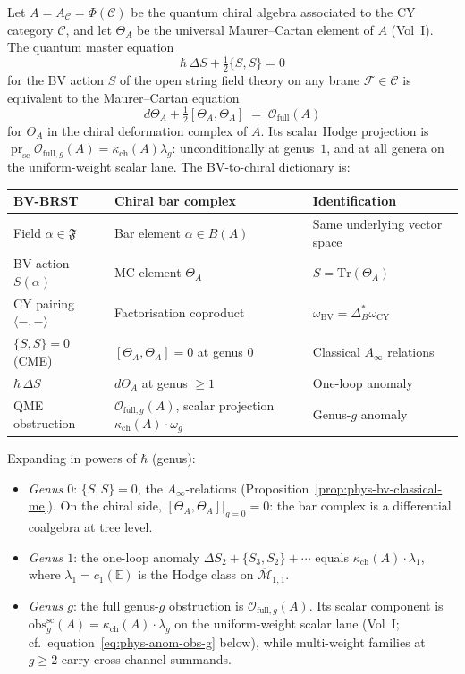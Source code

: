\begin{theorem}[Quantum master equation = Maurer--Cartan equation for \texorpdfstring{$\Theta_A$}{Theta-A}]
\label{thm:phys-bv-qme-mc}
Let $A = A_\mathcal{C} = \Phi(\mathcal{C})$ be the quantum chiral algebra associated to the CY category $\mathcal{C}$, and let $\Theta_A$ be the universal Maurer--Cartan element of $A$ (Vol~I). The quantum master equation
\[
 \hbar\,\Delta S + \tfrac{1}{2}\{S, S\} = 0
\]
for the BV action $S$ of the open string field theory on any brane $\mathcal{F} \in \mathcal{C}$ is equivalent to the Maurer--Cartan equation
\[
 d\Theta_A + \tfrac{1}{2}[\Theta_A, \Theta_A] \;=\; \mathcal{O}_{\mathrm{full}}(A)
\]
for $\Theta_A$ in the chiral deformation complex of $A$. Its scalar
Hodge projection is $\operatorname{pr}_{\mathrm{sc}}\mathcal{O}_{\mathrm{full},g}(A)
= \kappa_{\mathrm{ch}}(A)\lambda_g$: unconditionally at genus~$1$, and at
all genera on the uniform-weight scalar lane. The BV-to-chiral dictionary is:
\begin{center}
\renewcommand{\arraystretch}{1.3}
\begin{tabular}{lll}
 \textbf{BV-BRST} & \textbf{Chiral bar complex} & \textbf{Identification} \\
 \hline
 Field $\alpha \in \mathfrak{F}$ & Bar element $\alpha \in B(A)$ & Same underlying vector space \\
 BV action $S(\alpha)$ & MC element $\Theta_A$ & $S = \mathrm{Tr}(\Theta_A)$ \\
 CY pairing $\langle -,- \rangle$ & Factorisation coproduct & $\omega_{\mathrm{BV}} = \Delta_B^*\omega_{\mathrm{CY}}$ \\
 $\{S,S\} = 0$ (CME) & $[\Theta_A, \Theta_A] = 0$ at genus $0$ & Classical $A_\infty$ relations \\
 $\hbar\,\Delta S$ & $d\Theta_A$ at genus $\geq 1$ & One-loop anomaly \\
 QME obstruction & $\mathcal{O}_{\mathrm{full},g}(A)$, scalar projection $\kappa_{\mathrm{ch}}(A)\cdot\omega_g$ & Genus-$g$ anomaly
\end{tabular}
\end{center}
Expanding in powers of $\hbar$ (genus):
\begin{itemize}
 \item \emph{Genus $0$}: $\{S,S\} = 0$, the $A_\infty$-relations (Proposition~\ref{prop:phys-bv-classical-me}). On the chiral side, $[\Theta_A, \Theta_A]|_{g=0} = 0$: the bar complex is a differential coalgebra at tree level.
 \item \emph{Genus $1$}: the one-loop anomaly $\Delta S_2 + \{S_3, S_2\} + \cdots$ equals $\kappa_{\mathrm{ch}}(A)\cdot\lambda_1$, where $\lambda_1 = c_1(\mathbb{E})$ is the Hodge class on $\overline{\mathcal{M}}_{1,1}$.
 \item \emph{Genus $g$}: the full genus-$g$ obstruction is
 $\mathcal{O}_{\mathrm{full},g}(A)$. Its scalar component is
 $\mathrm{obs}^{\mathrm{sc}}_g(A)=\kappa_{\mathrm{ch}}(A)\cdot\lambda_g$
 on the uniform-weight scalar lane (Vol~I; cf.~equation~\eqref{eq:phys-anom-obs-g}
 below), while multi-weight families at $g\geq2$ carry cross-channel
 summands.
\end{itemize}
\end{theorem}

